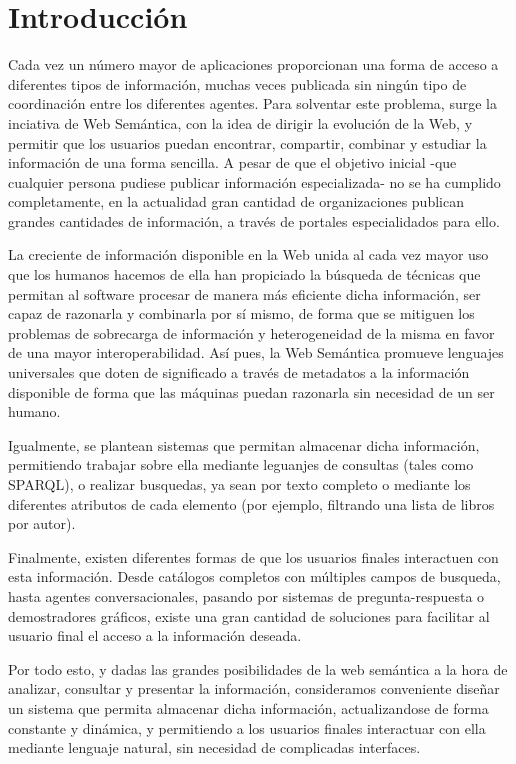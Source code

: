 \documentclass[a4paper,11pt]{report}
\begin{document}
\chapter*{Introducción}

Cada vez un número mayor de aplicaciones proporcionan una forma de acceso a diferentes tipos de información, muchas veces publicada sin ningún tipo de coordinación entre los diferentes agentes. Para solventar este problema, surge la inciativa de Web Semántica, con la idea de dirigir la evolución de la Web, y permitir que los usuarios puedan encontrar, compartir, combinar y estudiar la información de una forma sencilla. A pesar de que el objetivo inicial -que cualquier persona pudiese publicar información especializada- no se ha cumplido completamente, en la actualidad gran cantidad de organizaciones publican grandes cantidades de información, a través de portales especialidados para ello.

La creciente de información disponible en la Web unida al cada vez mayor uso que los humanos hacemos de ella han propiciado la búsqueda de técnicas que permitan al software procesar de manera más eficiente dicha información, ser capaz de razonarla y combinarla por sí mismo, de forma que se mitiguen los problemas de sobrecarga de información y heterogeneidad de la misma en favor de una mayor interoperabilidad. Así pues, la Web Semántica promueve lenguajes universales que doten de significado a través de metadatos a la información disponible de forma que las máquinas puedan razonarla sin necesidad de un ser humano.

Igualmente, se plantean sistemas que permitan almacenar dicha información, permitiendo trabajar sobre ella mediante leguanjes de consultas (tales como SPARQL), o realizar busquedas, ya sean por texto completo o mediante los diferentes atributos de cada elemento (por ejemplo, filtrando una lista de libros por autor).

Finalmente, existen diferentes formas de que los usuarios finales interactuen con esta información. Desde catálogos completos con múltiples campos de busqueda, hasta agentes conversacionales, pasando por sistemas de pregunta-respuesta o demostradores gráficos, existe una gran cantidad de soluciones para facilitar al usuario final el acceso a la información deseada.

Por todo esto, y dadas las grandes posibilidades de la web semántica a la hora de analizar, consultar y presentar la información, consideramos conveniente diseñar un sistema que permita almacenar dicha información, actualizandose de forma constante y dinámica, y permitiendo a los usuarios finales interactuar con ella mediante lenguaje natural, sin necesidad de complicadas interfaces.
\end{document}
